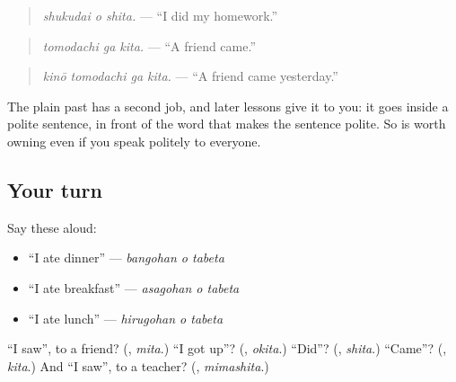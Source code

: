 \begin{quote}
\textbf{ }
\end{quote}

\begin{quote}
\emph{shukudai o shita.} — \textquotedblleft{}I did my homework.\textquotedblright{}
\end{quote}

\begin{quote}
\textbf{ }
\end{quote}

\begin{quote}
\emph{tomodachi ga kita.} — \textquotedblleft{}A friend came.\textquotedblright{}
\end{quote}

\begin{quote}
\textbf{  }
\end{quote}

\begin{quote}
\emph{kinō tomodachi ga kita.} — \textquotedblleft{}A friend came yesterday.\textquotedblright{}
\end{quote}

The plain past has a second job, and later lessons give it to you: it goes inside a polite sentence, in front of the word that makes the sentence polite. So \textbf{} is worth owning even if you speak politely to everyone.

\subsection*{Your turn}
Say these aloud:

\begin{itemize}
\raggedright
  \item \textquotedblleft{}I ate dinner\textquotedblright{} — \emph{bangohan o tabeta}
  \item \textquotedblleft{}I ate breakfast\textquotedblright{} — \emph{asagohan o tabeta}
  \item \textquotedblleft{}I ate lunch\textquotedblright{} — \emph{hirugohan o tabeta}
\end{itemize}

\begin{tcolorbox}[breakable,colback=teal!4,colframe=teal!35!black,title={Before you move on}]
\textquotedblleft{}I saw\textquotedblright{}, to a friend? (\textbf{}, \emph{mita}.) \textquotedblleft{}I got up\textquotedblright{}? (\textbf{}, \emph{okita}.) \textquotedblleft{}Did\textquotedblright{}? (\textbf{}, \emph{shita}.) \textquotedblleft{}Came\textquotedblright{}? (\textbf{}, \emph{kita}.) And \textquotedblleft{}I saw\textquotedblright{}, to a teacher? (\textbf{}, \emph{mimashita}.)
\end{tcolorbox}
